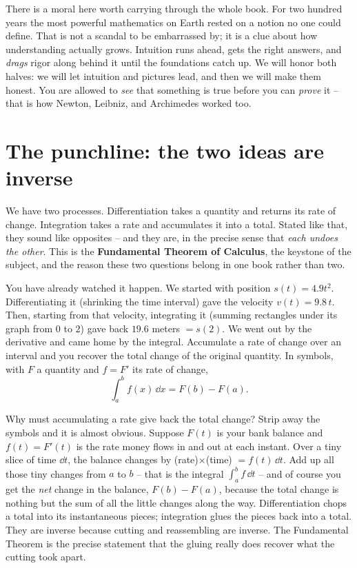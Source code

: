 \begin{aestheticbox}
There is a moral here worth carrying through the whole book. For two hundred
years the most powerful mathematics on Earth rested on a notion no one could
define. That is not a scandal to be embarrassed by; it is a clue about how
understanding actually grows. Intuition runs ahead, gets the right answers, and
\emph{drags} rigor along behind it until the foundations catch up. We will honor
both halves: we will let intuition and pictures lead, and then we will make them
honest. You are allowed to \emph{see} that something is true before you can
\emph{prove} it -- that is how Newton, Leibniz, and Archimedes worked too.
\end{aestheticbox}

\section{The punchline: the two ideas are inverse}

We have two processes. Differentiation takes a quantity and returns its rate of
change. Integration takes a rate and accumulates it into a total. Stated like
that, they sound like opposites -- and they are, in the precise sense that
\emph{each undoes the other}. This is the \textbf{Fundamental Theorem of
Calculus}, the keystone of the subject, and the reason these two questions belong
in one book rather than two.

You have already watched it happen. We started with position $s(t) = 4.9t^2$.
Differentiating it (shrinking the time interval) gave the velocity
$v(t) = 9.8\,t$. Then, starting from that velocity, integrating it (summing
rectangles under its graph from $0$ to $2$) gave back $19.6$ meters $= s(2)$. We
went out by the derivative and came home by the integral. Accumulate a rate of
change over an interval and you recover the total change of the original
quantity. In symbols, with $F$ a quantity and $f = F'$ its rate of change,
\[
  \int_a^b f(x)\,\dd x = F(b) - F(a).
\]

\begin{whybox}
Why must accumulating a rate give back the total change? Strip away the symbols
and it is almost obvious. Suppose $F(t)$ is your bank balance and $f(t) = F'(t)$
is the rate money flows in and out at each instant. Over a tiny slice of time
$\dd t$, the balance changes by (rate)$\times$(time) $= f(t)\,\dd t$. Add up all
those tiny changes from $a$ to $b$ -- that is the integral $\int_a^b f\,\dd t$ --
and of course you get the \emph{net} change in the balance, $F(b)-F(a)$, because
the total change is nothing but the sum of all the little changes along the way.
Differentiation chops a total into its instantaneous pieces; integration glues
the pieces back into a total. They are inverse because cutting and reassembling
are inverse. The Fundamental Theorem is the precise statement that the gluing
really does recover what the cutting took apart.
\end{whybox}

